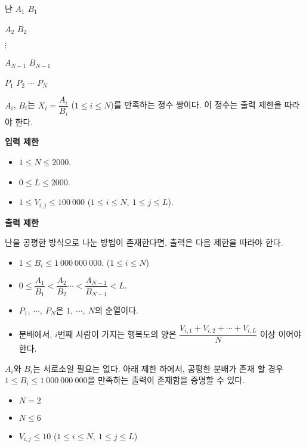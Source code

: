 \begin{problem}{난}
	$A_1$ $B_1$

	$A_2$ $B_2$

	$\vdots$ 
	
	$A_{N-1}$ $B_{N-1}$
	
	$P_1$ $P_2$ $\cdots$ $P_N$
	
	$A_i$, $B_i$는 $X_i = \dfrac{A_i}{B_i}$ ($1 \le i \le N$)를 만족하는 정수 쌍이다. 이 정수는 출력 제한을 따라야 한다.
	
	\Constraints


	{
	\large
	\textbf{입력 제한}
	}

	\begin{itemize}
		
		\item $1 \le N \le 2000$.
		\item $0 \le L \le 2000$.
		\item $1 \le V_{i, j} \le 100\ 000$ ($1 \le i \le N,\ 1 \le j \le L$).
	\end{itemize}

	{
	\large
	\textbf{출력 제한}
	}

	
	난을 공평한 방식으로 나눈 방법이 존재한다면, 출력은 다음 제한을 따라야 한다.
	
	\begin{itemize}
		\item $1 \le B_i \le 1\ 000\ 000\ 000$. ($1 \le i \le N$)
		\item $0 \le \dfrac{A_1}{B_1} < \dfrac{A_2}{B_2} \cdots < \dfrac{A_{N-1}}{B_{N-1}} < L$.
		\item $P_1, \ \cdots, \ P_N$은 $1, \ \cdots, \ N$의 순열이다.
		\item 분배에서, $i$번째 사람이 가지는 행복도의 양은 $\dfrac{V_{i, 1}+V_{i,2}+\cdots+V_{i,L}}{N}$ 이상 이어야 한다.
	\end{itemize}
	
	$A_i$와 $B_i$는 서로소일 필요는 없다.
	아래 제한 하에서, 공평한 분배가 존재 할 경우 $1 \le B_i \le 1\ 000\ 000\ 000$을 만족하는 출력이 존재함을 증명할 수 있다.
	
	\begin{itemize}
		\item $N = 2$
	\end{itemize}
	
	\begin{itemize}
		\item $N \le 6$ 
		\item $V_{i, j} \le 10$ ($1 \le i \le N,\ 1 \le j \le L$)
	\end{itemize}
	

\end{problem}
